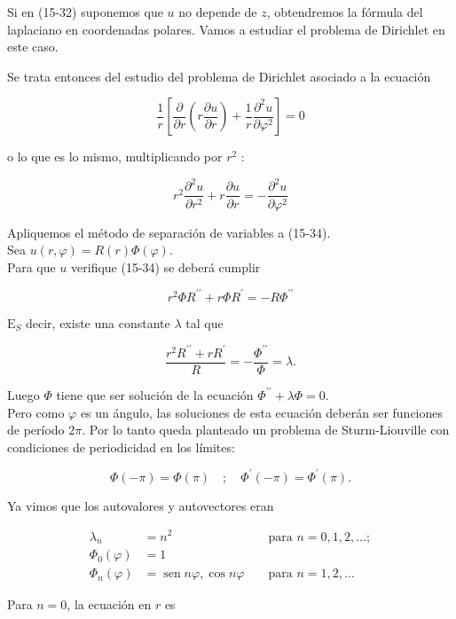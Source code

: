 \documentclass[10pt]{article}
\theoremstyle{plain}
\theoremstyle{definition}
\theoremstyle{remark}
\begin{document}
Si en (15-32) suponemos que $u$ no depende de $z$, obtendremos la fórmula del laplaciano en coordenadas polares. Vamos a estudiar el problema de Dirichlet en este caso.

Se trata entonces del estudio del problema de Dirichlet asociado a la ecuación

$$
\frac{1}{r}\left[\frac{\partial}{\partial r}\left(r \frac{\partial u}{\partial r}\right)+\frac{1}{r} \frac{\partial^{2} u}{\partial \varphi^{2}}\right]=0
$$

o lo que es lo mismo, multiplicando por $r^{2}$ :


\begin{equation*}
r^{2} \frac{\partial^{2} u}{\partial r^{2}}+r \frac{\partial u}{\partial r}=-\frac{\partial^{2} u}{\partial \varphi^{2}} \tag{15-34}
\end{equation*}


Apliquemos el método de separación de variables a (15-34).\\
Sea $u(r, \varphi)=R(r) \Phi(\varphi)$.\\
Para que $u$ verifique (15-34) se deberá cumplir

$$
r^{2} \Phi R^{\prime \prime}+r \Phi R^{\prime}=-R \Phi^{\prime \prime}
$$

$\mathrm{E}_{S}$ decir, existe una constante $\lambda$ tal que


$$
\frac{r^{2} R^{\prime \prime}+r R^{\prime}}{R}=-\frac{\Phi^{\prime \prime}}{\Phi}=\lambda .
$$

Luego $\Phi$ tiene que ser solución de la ecuación $\Phi^{\prime \prime}+\lambda \Phi=0$.\\
Pero como $\varphi$ es un ángulo, las soluciones de esta ecuación deberán ser funciones de período $2 \pi$. Por lo tanto queda planteado un problema de Sturm-Liouville con condiciones de periodicidad en los límites:

$$
\Phi(-\pi)=\Phi(\pi) \quad ; \quad \Phi^{\prime}(-\pi)=\Phi^{\prime}(\pi) .
$$

Ya vimos que los autovalores y autovectores eran

$$
\begin{aligned}
\lambda_{n} & =n^{2} & & \text { para } n=0,1,2, \ldots ; \\
\Phi_{0}(\varphi) & =1 & & \\
\Phi_{n}(\varphi) & =\operatorname{sen} n \varphi, \cos n \varphi & & \text { para } n=1,2, \ldots
\end{aligned}
$$

Para $n=0$, la ecuación en $r$ es
\end{document}
